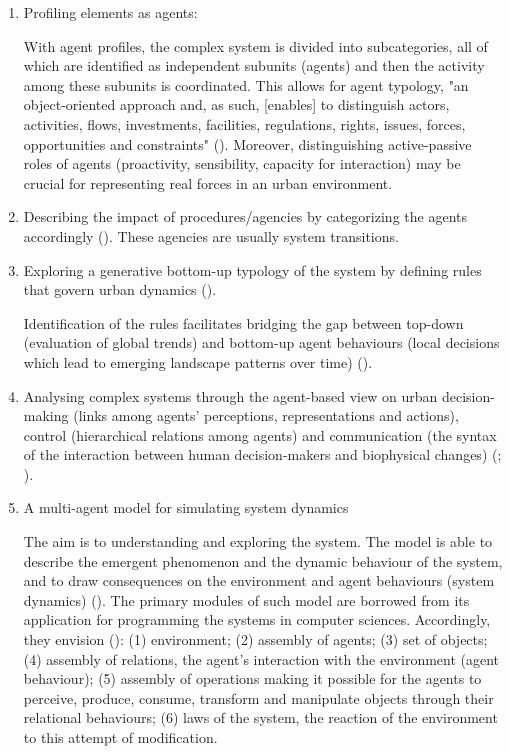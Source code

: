 \documentclass[11pt]{report}
\begin{document}
\begin{enumerate}
\item Profiling elements as agents: 

With agent profiles, the complex system is divided into subcategories, all of which are identified as independent subunits (agents) and then the activity among these subunits is coordinated. This allows for agent typology, "an object-oriented approach and, as such, [enables] to distinguish actors, activities, flows, investments, facilities, regulations, rights, issues, forces, opportunities and constraints" (\cite{(Hopkins 1999; Saarloos et al. 2008)}). 
Moreover, distinguishing active-passive roles of agents (proactivity, sensibility, capacity for interaction) may be crucial for representing real forces in an urban environment.
 
\item Describing the impact of procedures/agencies by categorizing the agents accordingly (\cite{(Arsanjani et al. 2013)}). These agencies are usually system transitions.

\item Exploring a generative bottom-up typology of the system by defining rules that govern urban dynamics (\cite{(Bretagnolle and Pumain 2010)}).

Identification of the rules facilitates bridging the gap between top-down (evaluation of global trends) and bottom-up agent behaviours (local decisions which lead to emerging landscape patterns over time) (\cite{(Bone et al. 2011)}). 

\item Analysing complex systems through the agent-based view on urban decision-making (links among agents' perceptions, representations and actions), control (hierarchical relations among agents) and communication (the syntax of the interaction between human decision-makers and biophysical changes) (\href{Bousquet}{\citealt{bousquet_multi-agent_2004}}; \citealt{D. G. Brown et al. 2008)}).

\item A multi-agent model for simulating system dynamics

The aim is to understanding and exploring the system. The model is able to describe the emergent phenomenon and the dynamic behaviour of the system,  and to draw  consequences on the environment and agent behaviours (system dynamics) (\cite{(Diappi and Bolchi 2008)}). The primary modules of such model are borrowed from its application for programming the systems in computer sciences.
Accordingly, they envision (\cite{(Brown et al. 2005)}):
(1) environment;
(2) assembly of agents;
(3) set of objects;
(4) assembly of relations, the agent’s interaction with the environment (agent behaviour);
(5) assembly of operations making it possible for the agents to perceive, produce, consume, transform and manipulate objects through their relational behaviours;
(6) laws of the system, the reaction  of  the  environment  to  this  attempt  of  modification.
\end{enumerate}
\end{document}
